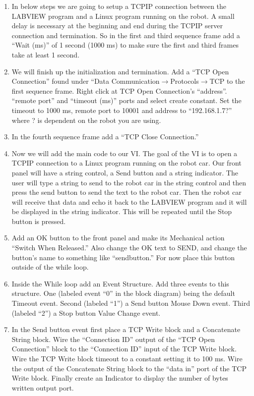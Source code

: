\documentclass[11pt]{article}
\begin{document}
\begin{enumerate}
    \item In below steps we are going to setup a TCPIP connection between the LABVIEW program and a Linux program running on the robot. A small delay is necessary at the beginning and end during the TCPIP server connection and termination. So in the first and third sequence frame add a “Wait (ms)” of 1 second (1000 ms) to make sure the first and third frames take at least 1 second.
    \item We will finish up the initialization and termination. Add a “TCP Open Connection” found under “Data Communication$\rightarrow$Protocols$\rightarrow$TCP to the first sequence frame. Right click at TCP Open Connection’s “address”. “remote port” and “timeout (ms)” ports and select create constant. Set the timeout to 1000 ms, remote port to 10001 and address to “192.168.1.7?” where ? is dependent on the robot you are using.
    \item In the fourth sequence frame add a “TCP Close Connection.”
    \item Now we will add the main code to our VI. The goal of the VI is to open a TCPIP connection to a Linux program running on the robot car. Our front panel will have a string control, a Send button and a string indicator. The user will type a string to send to the robot car in the string control and then press the send button to send the text to the robot car. Then the robot car will receive that data and echo it back to the LABVIEW program and it will be displayed in the string indicator. This will be repeated until the Stop button is pressed.
    \item Add an OK button to the front panel and make its Mechanical action “Switch When Released.” Also change the OK text to SEND, and change the button’s name to something like “sendbutton.” For now place this button outside of the while loop.
    \item Inside the While loop add an Event Structure. Add three events to this structure. One (labeled event “0” in the block diagram) being the default Timeout event. Second (labeled “1”) a Send button Mouse Down event. Third (labeled “2”) a Stop button Value Change event.
    \item In the Send button event first place a TCP Write block and a Concatenate String block. Wire the “Connection ID” output of the “TCP Open Connection” block to the “Connection ID” input of the TCP Write block. Wire the TCP Write block timeout to a constant setting it to 100 ms. Wire the output of the Concatenate String block to the “data in” port of the TCP Write block. Finally create an Indicator to display the number of bytes written output port.

\end{enumerate}
\end{document}
